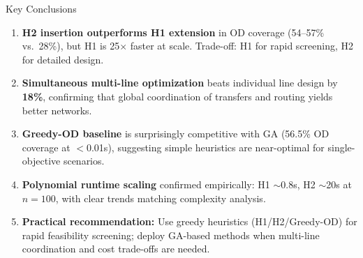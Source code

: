 \documentclass[final]{beamer}
\begin{document}
\begin{frame}[t]
\begin{minipage}[t]{0.48\paperwidth}
\begin{block}{\Large Key Conclusions}
\begin{enumerate}[leftmargin=*, label=\textcolor{shanghaitech}{\textbf{\arabic*.}}, itemsep=0.1em, parsep=0pt]
    \item \textbf{H2 insertion outperforms H1 extension} in OD coverage (54--57\% vs.\ 28\%), but H1 is 25$\times$ faster at scale. Trade-off: H1 for rapid screening, H2 for detailed design.
    \item \textbf{Simultaneous multi-line optimization} beats individual line design by \textbf{18\%}, confirming that global coordination of transfers and routing yields better networks.
    \item \textbf{Greedy-OD baseline} is surprisingly competitive with GA (56.5\% OD coverage at $<$0.01s), suggesting simple heuristics are near-optimal for single-objective scenarios.
    \item \textbf{Polynomial runtime scaling} confirmed empirically: H1 $\sim$0.8s, H2 $\sim$20s at $n{=}100$, with clear trends matching complexity analysis.
    \item \textbf{Practical recommendation:} Use greedy heuristics (H1/H2/Greedy-OD) for rapid feasibility screening; deploy GA-based methods when multi-line coordination and cost trade-offs are needed.
\end{enumerate}
\end{block}

\end{minipage}
\hfill
\begin{minipage}[t]{0.50\paperwidth}\normalsize


\end{minipage}
\end{frame}
\end{document}
